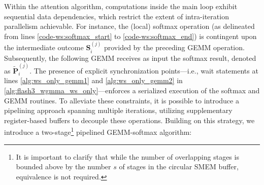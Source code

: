 \begin{enumerate}
Within the attention algorithm, computations inside the main loop exhibit sequential data dependencies, which restrict the extent of intra-iteration parallelism achievable. For instance, the (local) softmax operation (as delineated from lines \ref{code-ws:softmax_start} to \ref{code-ws:softmax_end}) is contingent upon the intermediate outcome $\mathbf{S}_i^{(j)}$ provided by the preceding GEMM operation. Subsequently, the following GEMM receives as input the softmax result, denoted as $\widetilde{\mathbf{P}}_i^{(j)}$. The presence of explicit synchronization points—i.e., wait statements at lines \ref{alg:ws_only_gemm1} and \ref{alg:ws_only_gemm2} in \cref{alg:flash3_wgmma_ws_only}—enforces a serialized execution of the softmax and GEMM routines. To alleviate these constraints, it is possible to introduce a pipelining approach spanning multiple iterations, utilizing supplementary register-based buffers to decouple these operations. Building on this strategy, we introduce a two-stage\footnote{It is important to clarify that while the number of overlapping stages is bounded above by the number $s$ of stages in the circular SMEM buffer, equivalence is not required.} pipelined GEMM-softmax algorithm:


\end{enumerate}
